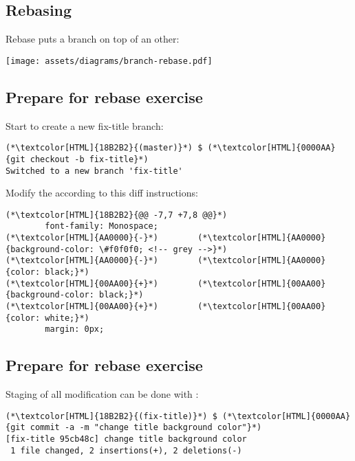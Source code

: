\subsection{Rebasing}
\begin{frame}[fragile]
  \subslidetitle
  Rebase puts a branch on top of an other:
  \centerline{\texttt{[image: assets/diagrams/branch-rebase.pdf]}}
\end{frame}

\subsection{Prepare for rebase exercise}
\begin{frame}[fragile]
  \subslidetitle

  Start to create a new fix-title branch:
  \begin{lstlisting}
(*\textcolor[HTML]{18B2B2}{(master)}*) $ (*\textcolor[HTML]{0000AA}{git checkout -b fix-title}*)
Switched to a new branch 'fix-title'
\end{lstlisting}

  Modify the  according to this diff instructions:
  \begin{lstlisting}
(*\textcolor[HTML]{18B2B2}{@@ -7,7 +7,8 @@}*)
        font-family: Monospace;
(*\textcolor[HTML]{AA0000}{-}*)        (*\textcolor[HTML]{AA0000}{background-color: \#f0f0f0; <!-- grey -->}*)
(*\textcolor[HTML]{AA0000}{-}*)        (*\textcolor[HTML]{AA0000}{color: black;}*)
(*\textcolor[HTML]{00AA00}{+}*)        (*\textcolor[HTML]{00AA00}{background-color: black;}*)
(*\textcolor[HTML]{00AA00}{+}*)        (*\textcolor[HTML]{00AA00}{color: white;}*)
        margin: 0px;
\end{lstlisting}
\end{frame}

\subsection{Prepare for rebase exercise}
\begin{frame}[fragile]
  \subslidetitle
  Staging of all modification can be done with :
  \begin{lstlisting}
(*\textcolor[HTML]{18B2B2}{(fix-title)}*) $ (*\textcolor[HTML]{0000AA}{git commit -a -m "change title background color"}*)
[fix-title 95cb48c] change title background color
 1 file changed, 2 insertions(+), 2 deletions(-)
\end{lstlisting}

\end{frame}

